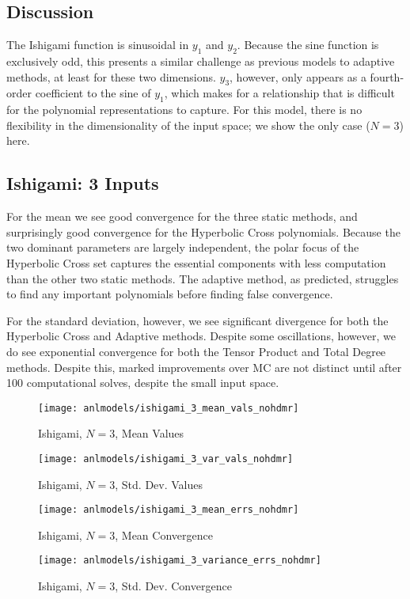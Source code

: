 \subsection{Discussion}
The Ishigami function is sinusoidal in $y_1$ and $y_2$.  Because the sine function is exclusively odd, this presents
a similar challenge as previous models to adaptive methods, at least for these two dimensions.  $y_3$, however, only
appears as a fourth-order coefficient to the sine of $y_1$, which makes for a relationship that is difficult for the
polynomial representations to capture.  For this model, there is no flexibility in the dimensionality of the
input space; we show the only case ($N=3$) here.

\subsection{Ishigami: 3 Inputs}
For the mean we see good convergence for the three static methods, and surprisingly good convergence for the
Hyperbolic Cross polynomials.  Because the two dominant parameters are largely independent, the polar focus of
the Hyperbolic Cross set captures the essential components with less computation than the other two static
methods.  The adaptive method, as predicted, struggles to find any important polynomials before finding false
convergence.

For the standard deviation, however, we see significant divergence for both the Hyperbolic Cross and Adaptive
methods.  Despite some oscillations, however, we do see exponential convergence for both the Tensor Product
and Total Degree methods.  Despite this, marked improvements over MC are not distinct until after 100
computational solves, despite the small input space.
\begin{figure}[H]
  \centering
  \texttt{[image: anlmodels/ishigami\_3\_mean\_vals\_nohdmr]}
  \caption{Ishigami, $N=3$, Mean Values}
  \label{fig:ishigami mean values 3}
\end{figure}
\begin{figure}[H]
  \centering
  \texttt{[image: anlmodels/ishigami\_3\_var\_vals\_nohdmr]}
  \caption{Ishigami, $N=3$, Std. Dev. Values}
  \label{fig:ishigami var values 3}
\end{figure}

\begin{figure}[H]
  \centering
  \texttt{[image: anlmodels/ishigami\_3\_mean\_errs\_nohdmr]}
  \caption{Ishigami, $N=3$, Mean Convergence}
  \label{fig:ishigami mean errors 3}
\end{figure}
\begin{figure}[H]
  \centering
  \texttt{[image: anlmodels/ishigami\_3\_variance\_errs\_nohdmr]}
  \caption{Ishigami, $N=3$, Std. Dev. Convergence}
  \label{fig:ishigami var errors 3}
\end{figure}


